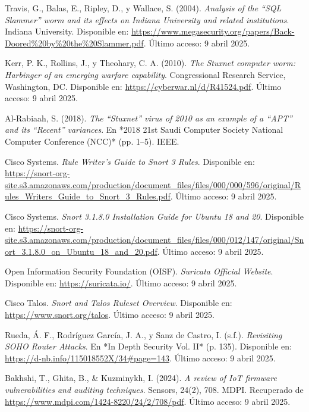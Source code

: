 \documentclass[12pt,a4paper]{report}
\begin{document}
\begin{thebibliography}{29}
	Travis, G., Balas, E., Ripley, D., y Wallace, S. (2004). \textit{Analysis of the “SQL Slammer” worm and its effects on Indiana University and related institutions}. Indiana University. Disponible en: \url{https://www.megasecurity.org/papers/Back-Doored%20by%20the%20Slammer.pdf}. Último acceso: 9 abril 2025.
	
	Kerr, P. K., Rollins, J., y Theohary, C. A. (2010). \textit{The Stuxnet computer worm: Harbinger of an emerging warfare capability}. Congressional Research Service, Washington, DC. Disponible en: \url{https://cyberwar.nl/d/R41524.pdf}. Último acceso: 9 abril 2025.
	
	Al-Rabiaah, S. (2018). \textit{The “Stuxnet” virus of 2010 as an example of a “APT” and its “Recent” variances}. En *2018 21st Saudi Computer Society National Computer Conference (NCC)* (pp. 1--5). IEEE.
	
	Cisco Systems. \textit{Rule Writer’s Guide to Snort 3 Rules}. Disponible en: \url{https://snort-org-site.s3.amazonaws.com/production/document_files/files/000/000/596/original/Rules_Writers_Guide_to_Snort_3_Rules.pdf}. Último acceso: 9 abril 2025.
	
	Cisco Systems. \textit{Snort 3.1.8.0 Installation Guide for Ubuntu 18 and 20}. Disponible en: \url{https://snort-org-site.s3.amazonaws.com/production/document_files/files/000/012/147/original/Snort_3.1.8.0_on_Ubuntu_18_and_20.pdf}. Último acceso: 9 abril 2025.
	
	Open Information Security Foundation (OISF). \textit{Suricata Official Website}. Disponible en: \url{https://suricata.io/}. Último acceso: 9 abril 2025.
	
	Cisco Talos. \textit{Snort and Talos Ruleset Overview}. Disponible en: \url{https://www.snort.org/talos}. Último acceso: 9 abril 2025.
	
	Rueda, Á. F., Rodríguez García, J. A., y Sanz de Castro, I. (s.f.). \textit{Revisiting SOHO Router Attacks}. En *In Depth Security Vol. II* (p. 135). Disponible en: \url{https://d-nb.info/115018552X/34#page=143}. Último acceso: 9 abril 2025.
	
	Bakhshi, T., Ghita, B., \& Kuzminykh, I. (2024). \textit{A review of IoT firmware vulnerabilities and auditing techniques}. Sensors, 24(2), 708. MDPI. Recuperado de \url{https://www.mdpi.com/1424-8220/24/2/708/pdf}. Último acceso: 9 abril 2025.
	

\end{thebibliography}
\end{document}

